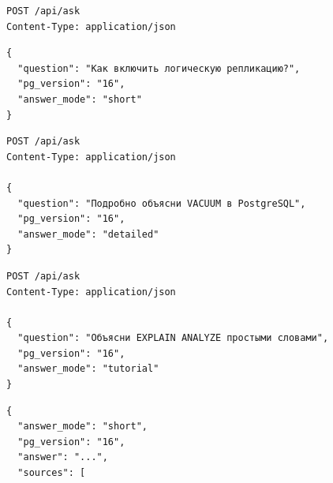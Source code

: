 \begin{listingblock}[25mm]
\label{listing:appendix-request-short}
\begin{verbatim}
POST /api/ask
Content-Type: application/json
\end{verbatim}
\end{listingblock}

\begin{listingblock}[24mm]
\begin{verbatim}
{
  "question": "Как включить логическую репликацию?",
  "pg_version": "16",
  "answer_mode": "short"
}
\end{verbatim}
\end{listingblock}

\begin{listingblock}[65mm]
\label{listing:appendix-request-detailed}
\begin{verbatim}
POST /api/ask
Content-Type: application/json

{
  "question": "Подробно объясни VACUUM в PostgreSQL",
  "pg_version": "16",
  "answer_mode": "detailed"
}
\end{verbatim}
\end{listingblock}

\begin{listingblock}[65mm]
\label{listing:appendix-request-tutorial}
\begin{verbatim}
POST /api/ask
Content-Type: application/json

{
  "question": "Объясни EXPLAIN ANALYZE простыми словами",
  "pg_version": "16",
  "answer_mode": "tutorial"
}
\end{verbatim}
\end{listingblock}

\begin{listingblock}[25mm]
\label{listing:appendix-response-short}
\begin{verbatim}
{
  "answer_mode": "short",
  "pg_version": "16",
  "answer": "...",
  "sources": [
\end{verbatim}
\end{listingblock}

